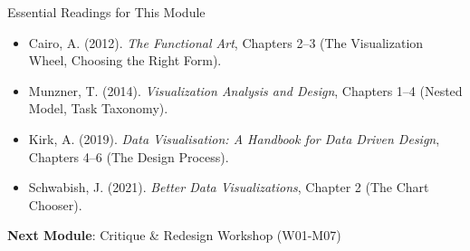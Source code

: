 \documentclass[10pt]{beamer}
\begin{document}
\begin{frame}{Essential Readings for This Module}
  \begin{itemize}
    \item Cairo, A. (2012). \emph{The Functional Art}, Chapters 2--3
          (The Visualization Wheel, Choosing the Right Form).
    \item Munzner, T. (2014). \emph{Visualization Analysis and Design},
          Chapters 1--4 (Nested Model, Task Taxonomy).
    \item Kirk, A. (2019). \emph{Data Visualisation: A Handbook for
          Data Driven Design}, Chapters 4--6 (The Design Process).
    \item Schwabish, J. (2021). \emph{Better Data Visualizations},
          Chapter 2 (The Chart Chooser).
  \end{itemize}

  \vspace{6pt}
  \textbf{Next Module}: Critique \& Redesign Workshop (W01-M07)
\end{frame}
\end{document}

